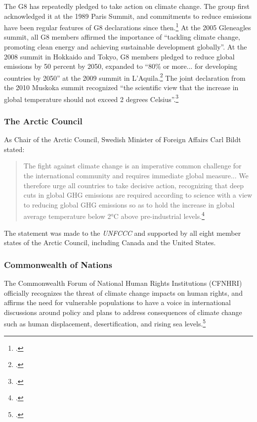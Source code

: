 \documentclass[10pt]{article}
\begin{document}
The G8 has repeatedly pledged to take action on climate change.
The group first acknowledged it at the 1989 Paris Summit, and commitments to reduce emissions have been regular features of G8 declarations since then.\footcite[][p. 127]{ClarkeDomaradzki2011}
At the 2005 Gleneagles summit, all G8 members affirmed the importance of ``tackling climate change, promoting clean energy and achieving sustainable development globally''.
At the 2008 summit in Hokkaido and Tokyo, G8 members pledged to reduce global emissions by 50 percent by 2050, expanded to ``80\% or more... for developing countries by 2050'' at the 2009 summit in L'Aquila.\footcite[][p. 128]{ClarkeDomaradzki2011}
The joint declaration from the 2010 Muskoka summit recognized ``the scientific view that the increase in global temperature should not exceed 2 degrees Celsius''.\footcite[][p. 151]{ClarkeDomaradzki2011}	



	\subsubsection{The Arctic Council}
	


As Chair of the Arctic Council, Swedish Minister of Foreign Affairs Carl Bildt stated:
\begin{quote}
The fight against climate change is an imperative common challenge for the international community and requires immediate global measure... We therefore urge all countries to take decisive action, recognizing that deep cuts in global GHG emissions are required according to science with a view to reducing global GHG emissions so as to hold the increase in global average temperature below 2°C above pre-industrial levels.\footcite[][]{BildtArcticCouncil}
\end{quote}
The statement was made to the \emph{UNFCCC} and supported by all eight member states of the Arctic Council, including Canada and the United States.



	\subsubsection{Commonwealth of Nations}
	


The Commonwealth Forum of National Human Rights Institutions (CFNHRI) officially recognizes the threat of climate change impacts on human rights, and affirms the need for vulnerable populations to have a voice in international discussions around policy and plans to address consequences of climate change such as human displacement, desertification, and rising sea levels.\footcite[][]{CFNHRIHumanRights}
\end{document}
